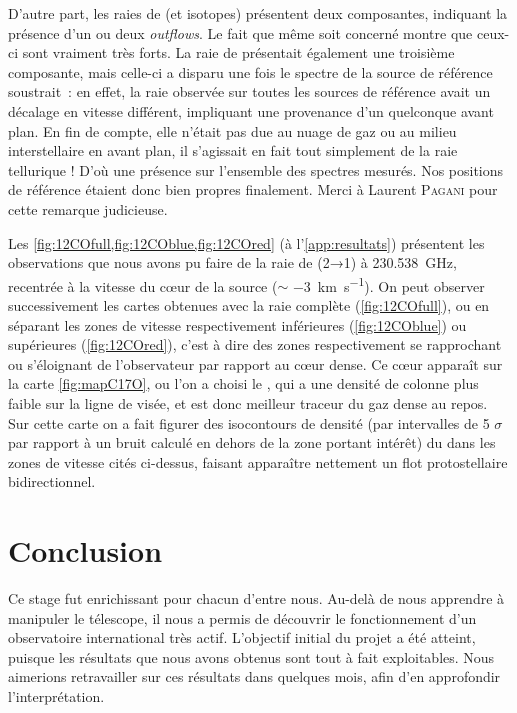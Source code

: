 \documentclass[a4paper,10pt,french]{article}
\begin{document}
D’autre part, les raies de  (et isotopes) présentent deux composantes,
indiquant la présence d’un ou deux \textit{outflows}. Le fait que même
 soit concerné montre que ceux-ci sont vraiment très forts. La raie
de  présentait également une troisième composante, mais celle-ci a
disparu une fois le spectre de la source de référence soustrait : en effet, la
raie observée sur toutes les sources de référence avait un décalage en vitesse
différent, impliquant une provenance d’un quelconque avant plan. En fin de
compte, elle n’était pas due au nuage de gaz ou au milieu interstellaire en
avant plan, il s’agissait en fait tout simplement de la raie tellurique ! D’où
une présence sur l’ensemble des spectres mesurés. Nos positions de référence
étaient donc bien propres finalement. Merci à Laurent \textsc{Pagani} pour
cette remarque judicieuse.

Les \cref{fig:12COfull,fig:12COblue,fig:12COred} (à l’\cref{app:resultats})
présentent les observations que nous avons pu faire de la raie de 
(2→1) à \SI{230.538}{\giga\hertz}, recentrée à la vitesse du cœur de la source
($\sim$ \SI{-3}{\kilo\meter\per\second}). On peut observer successivement les
cartes obtenues avec la raie complète (\cref{fig:12COfull}), ou en séparant les
zones de vitesse respectivement inférieures (\cref{fig:12COblue}) ou
supérieures (\cref{fig:12COred}), c’est à dire des zones respectivement se
rapprochant ou s’éloignant de l’observateur par rapport au cœur dense. Ce cœur
apparaît sur la carte \cref{fig:mapC17O}, ou l’on a choisi le , qui a
une densité de colonne plus faible sur la ligne de visée, et est donc meilleur
traceur du gaz dense au repos. Sur cette carte on a fait figurer des
isocontours de densité (par intervalles de 5 $\sigma$ par rapport à un bruit
calculé en dehors de la zone portant intérêt) du  dans les zones de
vitesse cités ci-dessus, faisant apparaître nettement un flot protostellaire
bidirectionnel.

\newpage
\section*{Conclusion}

Ce stage fut enrichissant pour chacun d’entre nous. Au-delà de nous apprendre à
manipuler le télescope, il nous a permis de découvrir le fonctionnement d’un
observatoire international très actif. L’objectif initial du projet a été
atteint, puisque les résultats que nous avons obtenus sont tout à fait
exploitables. Nous aimerions retravailler sur ces résultats dans quelques mois,
afin d’en approfondir l’interprétation.
\end{document}

